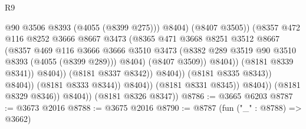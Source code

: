\begin{lexlean}{R9}
\begin{coremodule}
                                                  @90
                                                  @3506
                                                  @8393
                                                  (@4055 (@8399 @275)))
                                                @8404)
                                              (@8407 @3505))
                                            (@8357
                                              @472
                                              @116
                                              @8252
                                              @3666
                                              @8667
                                              @3473
                                              (@8365
                                                @471
                                                @3668
                                                @8251
                                                @3512
                                                @8667
                                                (@8357
                                                  @469
                                                  @116
                                                  @3666
                                                  @3666
                                                  @3510
                                                  @3473
                                                  (@8382
                                                    @289
                                                    @3519
                                                    @90
                                                    @3510
                                                    @8393
                                                    (@4055 (@8399 @289)))
                                                  @8404)
                                                (@8407 @3509))
                                              @8404))
                                          (@8181 @8339 @8341))
                                        @8404))
                                    (@8181 @8337 @8342))
                                  @8404))
                              (@8181 @8335 @8343))
                            @8404))
                        (@8181 @8333 @8344))
                      @8404))
                  (@8181 @8331 @8345))
                @8404))
            (@8181 @8329 @8346))
          @8404))
      (@8181 @8326 @8347))
@8786 := @3665 @6203
@8787 := @3673 @2016
@8788 := @3675 @2016
@8790 := @8787 (fun ("_" : @8788) => @3662)

\end{coremodule}
\end{lexlean}
